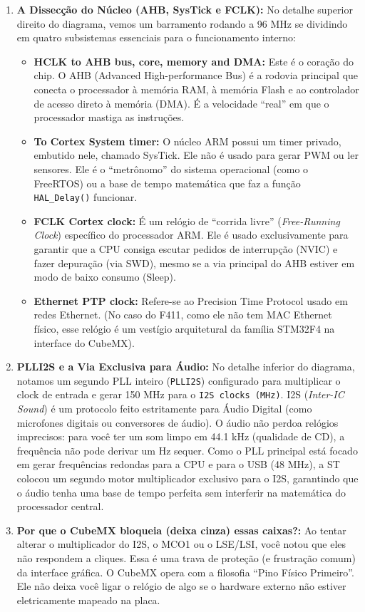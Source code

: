 \documentclass[12pt,a4paper]{article}
\begin{document}
\begin{enumerate}
    \item \textbf{A Dissecção do Núcleo (AHB, SysTick e FCLK):} No detalhe superior direito do diagrama, vemos um barramento rodando a 96 MHz se dividindo em quatro subsistemas essenciais para o funcionamento interno:
    \begin{itemize}
        \item \textbf{HCLK to AHB bus, core, memory and DMA:} Este é o coração do chip. O AHB (Advanced High-performance Bus) é a rodovia principal que conecta o processador à memória RAM, à memória Flash e ao controlador de acesso direto à memória (DMA). É a velocidade ``real'' em que o processador mastiga as instruções.
        \item \textbf{To Cortex System timer:} O núcleo ARM possui um timer privado, embutido nele, chamado SysTick. Ele não é usado para gerar PWM ou ler sensores. Ele é o ``metrônomo'' do sistema operacional (como o FreeRTOS) ou a base de tempo matemática que faz a função \texttt{HAL\_Delay()} funcionar.
        \item \textbf{FCLK Cortex clock:} É um relógio de ``corrida livre'' (\textit{Free-Running Clock}) específico do processador ARM. Ele é usado exclusivamente para garantir que a CPU consiga escutar pedidos de interrupção (NVIC) e fazer depuração (via SWD), mesmo se a via principal do AHB estiver em modo de baixo consumo (Sleep).
        \item \textbf{Ethernet PTP clock:} Refere-se ao Precision Time Protocol usado em redes Ethernet. (No caso do F411, como ele não tem MAC Ethernet físico, esse relógio é um vestígio arquitetural da família STM32F4 na interface do CubeMX).
    \end{itemize}
    \item \textbf{PLLI2S e a Via Exclusiva para Áudio:} No detalhe inferior do diagrama, notamos um segundo PLL inteiro (\texttt{PLLI2S}) configurado para multiplicar o clock de entrada e gerar 150 MHz para o \texttt{I2S clocks (MHz)}. I2S (\textit{Inter-IC Sound}) é um protocolo feito estritamente para Áudio Digital (como microfones digitais ou conversores de áudio). O áudio não perdoa relógios imprecisos: para você ter um som limpo em 44.1 kHz (qualidade de CD), a frequência não pode derivar um Hz sequer. Como o PLL principal está focado em gerar frequências redondas para a CPU e para o USB (48 MHz), a ST colocou um segundo motor multiplicador exclusivo para o I2S, garantindo que o áudio tenha uma base de tempo perfeita sem interferir na matemática do processador central.
    \item \textbf{Por que o CubeMX bloqueia (deixa cinza) essas caixas?:} Ao tentar alterar o multiplicador do I2S, o MCO1 ou o LSE/LSI, você notou que eles não respondem a cliques. Essa é uma trava de proteção (e frustração comum) da interface gráfica. O CubeMX opera com a filosofia ``Pino Físico Primeiro''. Ele não deixa você ligar o relógio de algo se o hardware externo não estiver eletricamente mapeado na placa.

\end{enumerate}
\end{document}
